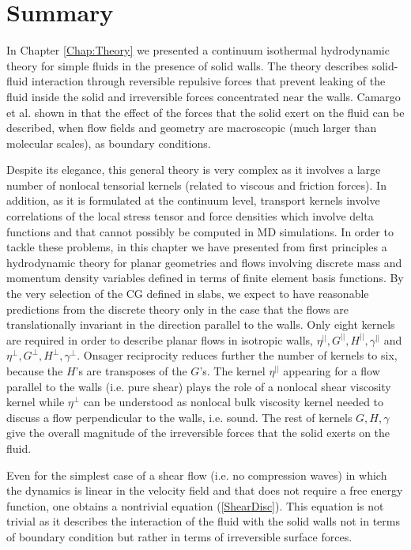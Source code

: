 \documentclass[b5paper,openright,10pt]{book}
\begin{document}
\section{Summary}
In Chapter \ref{Chap:Theory} we presented  a continuum isothermal
hydrodynamic  theory  for  simple  fluids in  the  presence  of  solid
walls. The theory describes solid-fluid interaction through reversible
repulsive forces  that prevent leaking  of the fluid inside  the solid
and irreversible forces concentrated near  the walls. Camargo et al. shown in
\cite{CamargoBC2018} that  the effect of  the forces that  the solid exert  on the
fluid can be described, when  flow fields and geometry are macroscopic
(much larger than molecular scales), as boundary conditions.

Despite  its elegance,  this  general  theory is  very  complex as  it
involves a  large number  of nonlocal  tensorial kernels  (related to
viscous and friction forces).  In addition, as it is formulated at the
continuum level,  transport kernels involve correlations  of the local
stress tensor and force densities  which involve delta functions
and that cannot  possibly be computed in MD simulations.   In order to
tackle these problems,  in this chapter we  have presented from
first principles a hydrodynamic theory for planar geometries and flows
involving  discrete mass  and  momentum density  variables defined  in
terms of finite element basis functions.  By the very selection of the
CG defined in slabs, we expect to have reasonable predictions from the
discrete theory  only in the  case that the flows  are translationally
invariant in the direction parallel  to the walls.  Only eight kernels
are required  in order  to describe planar  flows in  isotropic walls,
$\eta^{||},G^{||},H^{||},\gamma^{||}$                              and
$\eta^{\bot},G^{\bot},H^{\bot},\gamma^{\bot}$.    Onsager  reciprocity
reduces further  the number of kernels  to six, because the  $H$'s are
transposes of the $G$'s.  The  kernel $\eta^{||}$ appearing for a flow
parallel to the walls (i.e. pure  shear) plays the role of a nonlocal
shear  viscosity  kernel  while  $\eta^{\bot}$ can  be  understood  as
nonlocal bulk viscosity kernel needed to discuss a flow perpendicular
to the walls,  i.e. sound.  The rest of kernels  $G,H,\gamma$ give the
overall magnitude of the irreversible  forces that the solid exerts on
the fluid.

Even for the simplest case of a shear flow (i.e. no compression waves)
in which  the dynamics is linear  in the velocity field  and that does
not require a free energy function, one obtains a nontrivial equation
(\ref{ShearDisc}). This  equation is not  trivial as it  describes the
interaction of the fluid with the solid walls not in terms of boundary
condition but rather in terms of irreversible surface forces.
\end{document}
